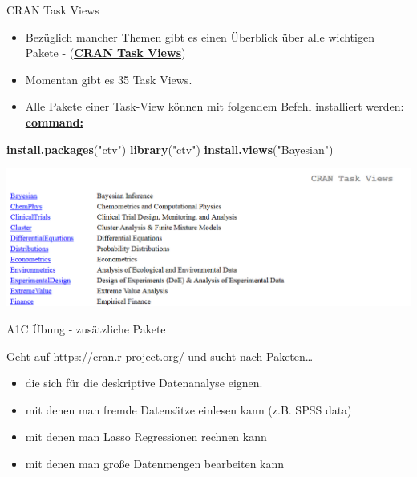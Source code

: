 \documentclass[ignorenonframetext,]{beamer}
\newenvironment{Shaded}{\begin{snugshade}}{\end{snugshade}}
\newcommand{\KeywordTok}[1]{\textcolor[rgb]{0.13,0.29,0.53}{\textbf{#1}}}
\newcommand{\NormalTok}[1]{#1}
\newcommand{\StringTok}[1]{\textcolor[rgb]{0.31,0.60,0.02}{#1}}
\providecommand{\tightlist}{%
  \setlength{\itemsep}{0pt}\setlength{\parskip}{0pt}}
\begin{document}
\begin{frame}[fragile]{CRAN Task Views}
\protect\hypertarget{cran-task-views}{}

\begin{itemize}
\tightlist
\item
  Bezüglich mancher Themen gibt es einen Überblick über alle wichtigen
  Pakete - (\href{https://cran.r-project.org/web/views/}{\textbf{CRAN
  Task Views}})
\item
  Momentan gibt es 35 Task Views.
\item
  Alle Pakete einer Task-View können mit folgendem Befehl installiert
  werden:
  \href{https://mran.microsoft.com/rpackages/}{\textbf{command:}}
\end{itemize}

\begin{Shaded}
\begin{Highlighting}[]
\KeywordTok{install.packages}\NormalTok{(}\StringTok{"ctv"}\NormalTok{)}
\KeywordTok{library}\NormalTok{(}\StringTok{"ctv"}\NormalTok{)}
\KeywordTok{install.views}\NormalTok{(}\StringTok{"Bayesian"}\NormalTok{)}
\end{Highlighting}
\end{Shaded}

\includegraphics{figure/CRANtaskViews.PNG}

\end{frame}

\begin{frame}{A1C Übung - zusätzliche Pakete}
\protect\hypertarget{a1c-ubung---zusatzliche-pakete}{}

Geht auf \url{https://cran.r-project.org/} und sucht nach
Paketen\ldots{}

\begin{itemize}
\tightlist
\item
  die sich für die deskriptive Datenanalyse eignen.
\item
  mit denen man fremde Datensätze einlesen kann (z.B. SPSS data)
\item
  mit denen man Lasso Regressionen rechnen kann
\item
  mit denen man große Datenmengen bearbeiten kann
\end{itemize}

\end{frame}
\end{document}
